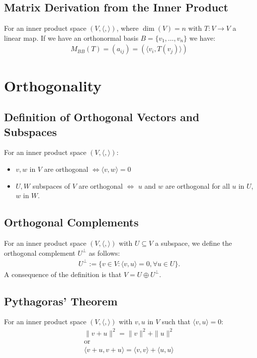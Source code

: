 \documentclass[a4paper, 12pt, twoside]{article}
\begin{document}
\subsection{Matrix Derivation from the Inner Product}

For an inner product space $(V, \langle , \rangle)$, where
$\dim(V) = n$ with $T : V \to V$ a linear map. If we have
an orthonormal basis $B = \{v_1, \ldots, v_n\}$ we have:
\begin{align*}
  M_{BB}(T) = (a_{ij}) = (\langle v_i, T(v_j) \rangle)
\end{align*}

\section{Orthogonality}

\subsection{Definition of Orthogonal Vectors and Subspaces}

For an inner product space $(V, \langle , \rangle)$:
\begin{itemize}
  \item $v, w$ in $V$ are orthogonal $\Leftrightarrow \langle v,w \rangle = 0$ 
  \item $U, W$ subspaces of $V$ are orthogonal $\Leftrightarrow$ 
    $u$ and $w$ are orthogonal for all $u$ in $U$, $w$ in $W$.
\end{itemize}

\subsection{Orthogonal Complements}

For an inner product space $(V, \langle , \rangle)$ with
$U \subseteq V$ a subspace, we define the orthogonal complement
$U^{\perp}$ as follows:
\begin{gather*}
  U^{\perp} := \{v \in V : \langle v,u \rangle = 0, \forall u \in U\}.
\end{gather*}
A consequence of the definition is that $V = U \oplus U^{\perp}$.

\subsection{Pythagoras' Theorem}

For an inner product space $(V, \langle , \rangle)$ with $v, u$ in
$V$ such that $\langle v,u \rangle = 0$:
\begin{gather*}
  \|v + u\|^2 = \|v\|^2 + \|u\|^2 \\
  \text{or} \\
  \langle v+u,v+u \rangle = \langle v,v \rangle + \langle u,u \rangle
\end{gather*}
\end{document}
